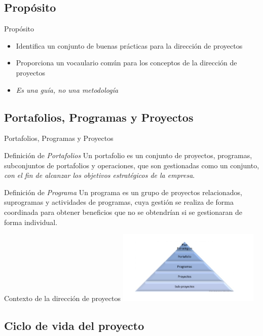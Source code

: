 \subsection{Propósito}
\begin{frame}{Propósito}
	
	\begin{itemize}
		\item{Identifica un conjunto de buenas prácticas para la dirección de proyectos}
		\item{Proporciona un vocaulario común para los conceptos de la dirección de proyectos}
		\item{\emph{Es una guía, no una metodología}}
	\end{itemize}
\end{frame}

\subsection{Portafolios, Programas y Proyectos}
\begin{frame}[allowframebreaks]{Portafolios, Programas y Proyectos}
	
	\begin{block}{Definición de \emph{Portafolios}}
		Un portafolio es un conjunto de proyectos, programas, subconjuntos de  portafolios y operaciones, que son gestionadas como un conjunto, \emph{con el fin de alcanzar los objetivos estratégicos de la empresa}.
	\end{block}


	\framebreak

	\begin{block}{Definición de \emph{Programa}}
		Un programa es un grupo de proyectos relacionados, suprogramas y actividades de programas, cuya gestión se realiza de forma coordinada para obtener beneficios que no se obtendrían si se gestionaran de forma individual.
	\end{block}


	\framebreak
	Contexto de la dirección de proyectos
	\includegraphics[height=3.5cm]{figuras/proy_prog_port_00.png}

\end{frame}


\subsection{Ciclo de vida del proyecto}